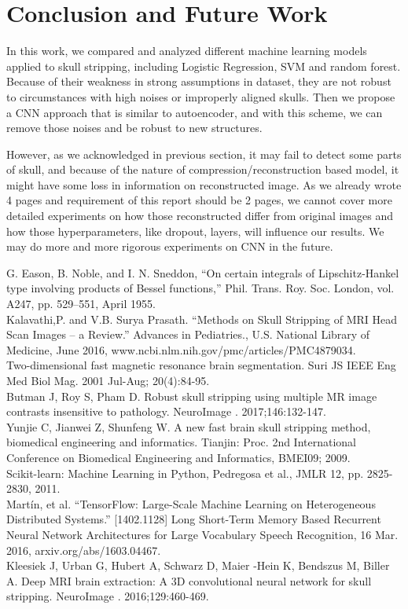 \documentclass[conference]{IEEEtran}
\begin{document}
\section{Conclusion and Future Work}
In this work, we compared and analyzed different machine learning models applied to skull stripping, including Logistic Regression, SVM and random forest. Because of their weakness in strong assumptions in dataset, they are not robust to circumstances with high noises or improperly aligned skulls. Then we propose a CNN approach that is similar to autoencoder, and with this scheme, we can remove those noises and be robust to new structures. 

However, as we acknowledged in previous section, it may fail to detect some parts of skull, and because of the nature of compression/reconstruction based model, it might have some loss in information on reconstructed image. As we already wrote 4 pages and requirement of this report should be 2 pages, we cannot cover more detailed experiments on how those reconstructed differ from original images and how those hyperparameters, like dropout, layers, will influence our results. We may do more and more rigorous experiments on CNN in the future. 

\begin{thebibliography}{00}
 G. Eason, B. Noble, and I. N. Sneddon, ``On certain integrals of Lipschitz-Hankel type involving products of Bessel functions,'' Phil. Trans. Roy. Soc. London, vol. A247, pp. 529--551, April 1955.\\
 Kalavathi,P. and V.B. Surya Prasath. ``Methods on Skull Stripping of MRI Head Scan Images -- a Review.'' Advances in Pediatries., U.S. National Library of Medicine, June 2016, www.ncbi.nlm.nih.gov/pmc/articles/PMC4879034.\\
 Two-dimensional fast magnetic resonance brain segmentation. Suri JS IEEE Eng Med Biol Mag. 2001 Jul-Aug; 20(4):84-95.\\
 Butman J, Roy S, Pham D. Robust skull stripping using multiple MR image contrasts insensitive to pathology. NeuroImage . 2017;146:132-147.\\
 Yunjie C, Jianwei Z, Shunfeng W. A new fast brain skull stripping method, biomedical engineering and informatics. Tianjin: Proc. 2nd International Conference on Biomedical Engineering and Informatics, BMEI09; 2009.\\
 Scikit-learn: Machine Learning in Python, Pedregosa et al., JMLR 12, pp. 2825-2830, 2011.\\
 Martín, et al. “TensorFlow: Large-Scale Machine Learning on Heterogeneous Distributed Systems.” [1402.1128] Long Short-Term Memory Based Recurrent Neural Network Architectures for Large Vocabulary Speech Recognition, 16 Mar. 2016, arxiv.org/abs/1603.04467.\\
 Kleesiek J, Urban G, Hubert A, Schwarz D, Maier -Hein K, Bendszus M, Biller A. Deep MRI brain extraction: A 3D convolutional neural network for skull stripping. NeuroImage . 2016;129:460-469.

\end{thebibliography}
\end{document}
